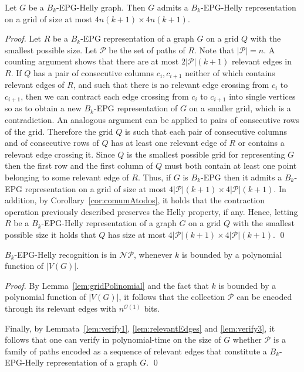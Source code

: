 \documentclass[runningheads]{llncs}
\begin{document}
\begin{lemma}\label{lem:gridPolinomial}
Let $G$ be a $B_k$-EPG-Helly graph. Then $G$ admits a $B_k$-EPG-Helly representation on a grid of size at most $4n(k+1) \times 4n(k+1)$.
\end{lemma}
\begin{proof}
Let $R$ be a $B_k$-EPG representation of a graph $G$ on a grid $Q$ with the smallest possible size.
Let $\mathcal{P}$ be the set of paths of $R$. Note that $|\mathcal{P}|=n$.
A counting argument shows that there are at most $2|\mathcal{P}|(k+1)$ relevant edges in $R$. 
 If $Q$ has a pair of consecutive columns $c_i,c_{i+1}$ neither of which contains relevant edges of $R$, and such that there is no relevant edge crossing from $c_i$ to $c_{i+1}$, then we can contract each edge crossing from $c_i$ to $c_{i+1}$ into single vertices so as to obtain a new  $B_k$-EPG representation of $G$ on a smaller grid, which is a contradiction. An analogous argument can be applied to pairs of consecutive rows of the grid.
 Therefore the grid $Q$ is such that each pair of consecutive columns and of consecutive rows of $Q$  has at least one relevant edge of $R$ or contains a relevant edge crossing it.  
  Since $Q$ is the smallest possible grid for representing $G$ then the first row and the first column of $Q$ must both contain at least one point belonging to some relevant edge of $R$. 
Thus, if $G$ is $B_k$-EPG then it admits a $B_k$-EPG representation on a grid of size at most $4|\mathcal{P}|(k+1) \times 4|\mathcal{P}|(k+1)$.
In addition, by Corollary~\ref{cor:comumAtodos}, it holds that the contraction operation previously described preserves the Helly property, if any. Hence, letting $R$ be a $B_k$-EPG-Helly representation of a graph $G$ on a grid $Q$ with the smallest possible size it holds that $Q$ has size at most $4|\mathcal{P}|(k+1) \times 4|\mathcal{P}|(k+1)$.
\qed
\end{proof}

\begin{theorem}\label{teo:nppertinencia}
{\sc $B_k$-EPG-Helly recognition} is in $\mathcal{NP}$, whenever $k$ is bounded by a polynomial function of $|V(G)|$.
\end{theorem}
\begin{proof}
By Lemma~\ref{lem:gridPolinomial} and the fact that $k$ is bounded by a polynomial function of $|V(G)|$, it follows that the collection $\mathcal{P}$ can be encoded through its relevant edges with $n^{\mathcal{O}(1)}$ bits.

Finally, by Lemmata~\ref{lem:verify1}, \ref{lem:relevantEdges} and \ref{lem:verify3}, it follows that one can verify in polynomial-time on the size of $G$ whether $\mathcal{P}$ is a family of paths encoded as a sequence of relevant edges that constitute a $B_k$-EPG-Helly representation of a graph $G$.
\qed
\end{proof}
\end{document}
